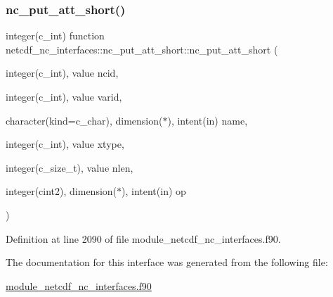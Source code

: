 \subsubsection{\texorpdfstring{nc\+\_\+put\+\_\+att\+\_\+short()}{nc\_put\_att\_short()}}
{\footnotesize\ttfamily integer(c\+\_\+int) function netcdf\+\_\+nc\+\_\+interfaces\+::nc\+\_\+put\+\_\+att\+\_\+short\+::nc\+\_\+put\+\_\+att\+\_\+short (\begin{DoxyParamCaption}\item[{integer(c\+\_\+int), value}]{ncid,  }\item[{integer(c\+\_\+int), value}]{varid,  }\item[{character(kind=c\+\_\+char), dimension($\ast$), intent(in)}]{name,  }\item[{integer(c\+\_\+int), value}]{xtype,  }\item[{integer(c\+\_\+size\+\_\+t), value}]{nlen,  }\item[{integer(cint2), dimension($\ast$), intent(in)}]{op }\end{DoxyParamCaption})}



Definition at line 2090 of file module\+\_\+netcdf\+\_\+nc\+\_\+interfaces.\+f90.



The documentation for this interface was generated from the following file\+:\begin{DoxyCompactItemize}
\item 
\hyperlink{module__netcdf__nc__interfaces_8f90}{module\+\_\+netcdf\+\_\+nc\+\_\+interfaces.\+f90}\end{DoxyCompactItemize}
